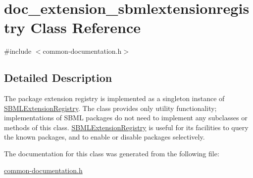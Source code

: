 \hypertarget{classdoc__extension__sbmlextensionregistry}{}\section{doc\+\_\+extension\+\_\+sbmlextensionregistry Class Reference}
\label{classdoc__extension__sbmlextensionregistry}


{\ttfamily \#include $<$common-\/documentation.\+h$>$}



\subsection{Detailed Description}
\begin{DoxyParagraph}{}
The package extension registry is implemented as a singleton instance of \hyperlink{class_s_b_m_l_extension_registry}{S\+B\+M\+L\+Extension\+Registry}. The class provides only utility functionality; implementations of S\+B\+ML packages do not need to implement any subclasses or methods of this class. \hyperlink{class_s_b_m_l_extension_registry}{S\+B\+M\+L\+Extension\+Registry} is useful for its facilities to query the known packages, and to enable or disable packages selectively. 
\end{DoxyParagraph}


The documentation for this class was generated from the following file\+:\begin{DoxyCompactItemize}
\item 
\hyperlink{common-documentation_8h}{common-\/documentation.\+h}\end{DoxyCompactItemize}
